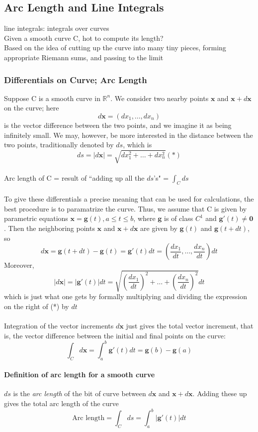 \documentclass[11pt]{article}
\newcommand{\ti}[1]{\textit{#1}}
\newcommand{\tb}[1]{\textbf{#1}}
\newcommand{\real}[0]{\mathbb{R}}
\newcommand{\vx}[0]{\tb{x}}
\newcommand{\vo}[0]{\tb{0}}
\begin{document}
\subsection{Arc Length and Line Integrals}
line integrals: integrals over curves\\
Given a smooth curve C, hot to compute its length? \\
Based on the idea of cutting up the curve into many tiny pieces, forming appropriate Riemann sums, and passing to the limit
\subsubsection{Differentials on Curve; Arc Length} Suppose C is a smooth curve in $\real^n$. We consider two nearby points $\vx$ and $\vx + d\vx$ on the curve; here
$$d\vx = (dx_1,\hdots,dx_n)$$
is the vector difference between the two points, and we imagine it as being infinitely small. We may, however, be more interested in the distance between the two points, traditionally denoted by $ds$, which is $$ds = |d\vx| = \sqrt{dx^2_1+\hdots+dx^2_n}(*)$$\\
Arc length of C = result of ``adding up all the $ds$'s" = $\int_Cds$\\\\
To give these differentials a precise meaning that can be used for calculations, the best procedure is to paramatrize the curve. Thus, we assume that C is given by parametric equations $\vx = \tb{g}(t), a\leq t \leq b$, where $\tb{g}$ is of class $C^1$ and $\tb{g}'(t) \neq \vo$. Then the neighboring points $\vx$ and $\vx + d\vx$ are given by $\tb{g}(t)$ and $\tb{g}(t+dt)$, so $$d\vx = \tb{g}(t+dt) - \tb{g}(t) = \tb{g}'(t)dt = (\frac{dx_1}{dt},\hdots,\frac{dx_n}{dt})dt$$ Moreover,
$$|d\vx| = |\tb{g}'(t)|dt = \sqrt{(\frac{dx_1}{dt})^2+ \hdots + (\frac{dx_n}{dt})^2}dt$$which is just what one gets by formally multiplying and dividing the expression on the right of (*) by $dt$\\\\
Integration of the vector increments $d\vx$ just gives the total vector increment, that is, the vector difference between the initial and final points on the curve:
$$\int_C d\vx = \int_a^b \tb{g}'(t)dt = \tb{g}(b)-\tb{g}(a)$$
\paragraph{Definition of arc length for a smooth curve}
$ds$ is the \ti{arc length} of the bit of curve between $d\vx$ and $\vx + d\vx$. Adding these up gives the total arc length of the curve
$$\mbox{Arc length} = \int_C ds = \int_a^b|\tb{g}'(t)|dt$$
\end{document}
